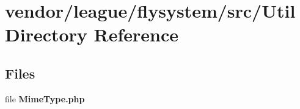 \section{vendor/league/flysystem/src/\+Util Directory Reference}
\label{dir_ece403b9843ecee9a28995b06f5ac87f}
\subsection*{Files}
\begin{DoxyCompactItemize}
\item 
file {\bf Mime\+Type.\+php}
\end{DoxyCompactItemize}
